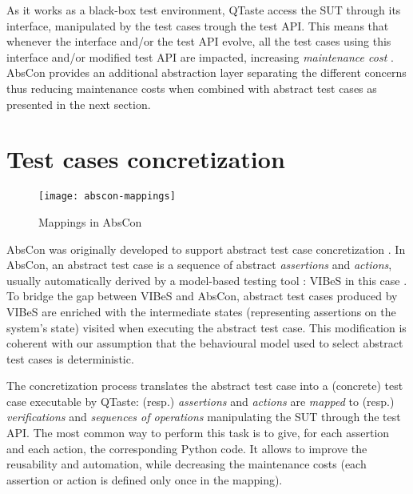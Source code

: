 As it works as a black-box test environment, QTaste access the SUT through its interface, manipulated by the test cases trough the test API. This means that whenever the interface and/or the test API evolve, all the test cases using this interface and/or modified test API are impacted, increasing \emph{maintenance cost} \cite{Utting2007}. AbsCon provides an additional abstraction layer separating the different concerns thus reducing maintenance costs when combined with abstract test cases as presented in the next section.   


\section{Test cases concretization}

\label{sec:abscon:abscon}

\begin{figure}
	\centering
	\texttt{[image: abscon-mappings]}
	\caption{Mappings in AbsCon}
	\label{fig:abscon:mappings}
\end{figure}

\gls{AbsCon} was originally developed to support \gls{abstract test case} \gls{concretization} \cite{Vanhecke2016}. In AbsCon, an abstract test case is a sequence of abstract \emph{assertions} and \emph{actions}, usually automatically derived by a model-based testing tool \cite{Utting2007}: VIBeS in this case \cite{vibes}. To bridge the gap between VIBeS and AbsCon, abstract test cases produced by VIBeS are enriched with the intermediate states (representing assertions on the system's state) visited when executing the abstract test case. This modification is coherent with our assumption that the behavioural model used to select  abstract test cases is deterministic.
 
The concretization process translates the abstract test case into a (concrete) test case executable by  QTaste: (resp.) \emph{assertions} and \emph{actions} are \emph{mapped} to (resp.) \emph{verifications} and \emph{sequences of operations} manipulating the SUT through the test API. The most common way to perform this task is to give, for each assertion and each action, the corresponding Python code. It allows to improve the reusability and automation, while decreasing the maintenance costs (each assertion or action is defined only once in the mapping). 

